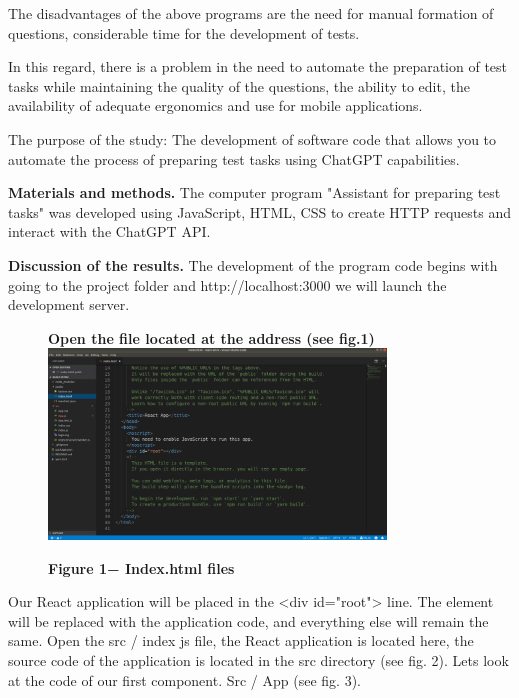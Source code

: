 \begin{multicols}{2}

The disadvantages of the above programs are the need for manual
formation of questions, considerable time for the development of tests.

In this regard, there is a problem in the need to automate the
preparation of test tasks while maintaining the quality of the
questions, the ability to edit, the availability of adequate ergonomics
and use for mobile applications.


The purpose of the study: The development of software code that allows
you to automate the process of preparing test tasks using ChatGPT
capabilities.

{\bfseries Materials and methods.} The computer program "Assistant for
preparing test tasks" was developed using JavaScript, HTML, CSS to
create HTTP requests and interact with the ChatGPT API.

{\bfseries Discussion of the results.} The development of the program code
begins with going to the project folder and http://localhost:3000 we
will launch the development server.


\end{multicols}

\begin{figure}[H]
	{\bfseries Open the file located at the address (see fig.1)}
	\centering
	\includegraphics[width=0.8\textwidth]{assets/126}
	\caption*{\bfseries Figure 1− Index.html files}
\end{figure}

\begin{multicols}{2}

Our React application will be placed in the \textless div id="root"\textgreater{} line. 
The element will be replaced with the application code, and everything 
else will remain the same.	Open the src / index js file, the React application is located here, the
source code of the application is located in the src directory (see fig.
2).
Let\textquotesingle s look at the code of our first component. Src / App (see fig. 3). 

\end{multicols}

